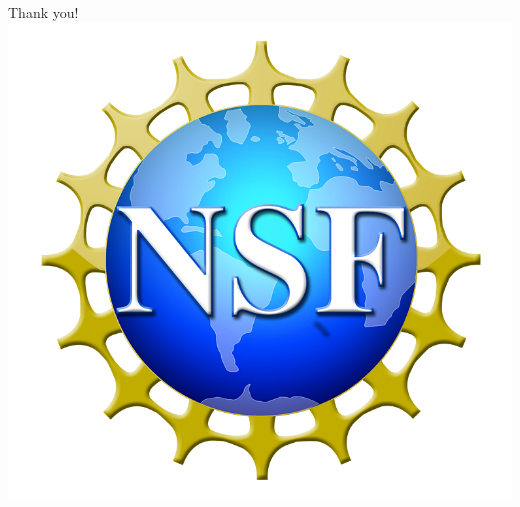 \documentclass[pdflatex,compress]{beamer}
\begin{document}
\begin{frame}
  \frametitle{}
  \begin{center}
    \Huge{Thank you!}\\
    \vspace{1cm}
    \includegraphics[width=\textwidth,height=0.25\textheight,keepaspectratio]{nsf-trans.png}
  \end{center}
\end{frame}


\end{document}
